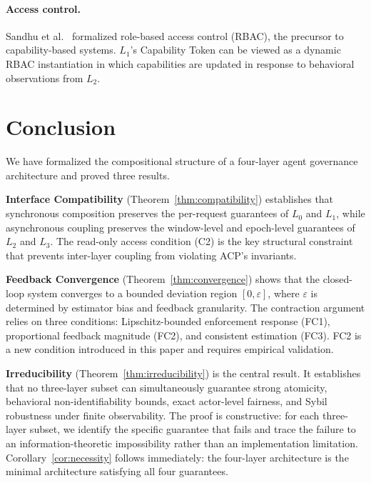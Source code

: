 \documentclass[11pt]{article}
\newcommand{\Layer}[1]{L_{#1}}
\begin{document}
\paragraph{Access control.}
Sandhu et al.~\cite{sandhu1996} formalized role-based access control (RBAC),
the precursor to capability-based systems. $\Layer{1}$'s Capability Token
can be viewed as a dynamic RBAC instantiation in which capabilities are
updated in response to behavioral observations from $\Layer{2}$.

\section{Conclusion}
\label{sec:conclusion}

We have formalized the compositional structure of a four-layer agent
governance architecture and proved three results.

\textbf{Interface Compatibility} (Theorem~\ref{thm:compatibility}) establishes
that synchronous composition preserves the per-request guarantees of
$\Layer{0}$ and $\Layer{1}$, while asynchronous coupling preserves the
window-level and epoch-level guarantees of $\Layer{2}$ and $\Layer{3}$.
The read-only access condition (C2) is the key structural constraint that
prevents inter-layer coupling from violating ACP's invariants.

\textbf{Feedback Convergence} (Theorem~\ref{thm:convergence}) shows that the
closed-loop system converges to a bounded deviation region $[0, \varepsilon]$,
where $\varepsilon$ is determined by estimator bias and feedback granularity.
The contraction argument relies on three conditions: Lipschitz-bounded
enforcement response (FC1), proportional feedback magnitude (FC2), and
consistent estimation (FC3). FC2 is a new condition introduced in this paper
and requires empirical validation.

\textbf{Irreducibility} (Theorem~\ref{thm:irreducibility}) is the central
result. It establishes that no three-layer subset can simultaneously guarantee
strong atomicity, behavioral non-identifiability bounds, exact actor-level
fairness, and Sybil robustness under finite observability. The proof is
constructive: for each three-layer subset, we identify the specific guarantee
that fails and trace the failure to an information-theoretic impossibility
rather than an implementation limitation. Corollary~\ref{cor:necessity}
follows immediately: the four-layer architecture is the minimal architecture
satisfying all four guarantees.
\end{document}
